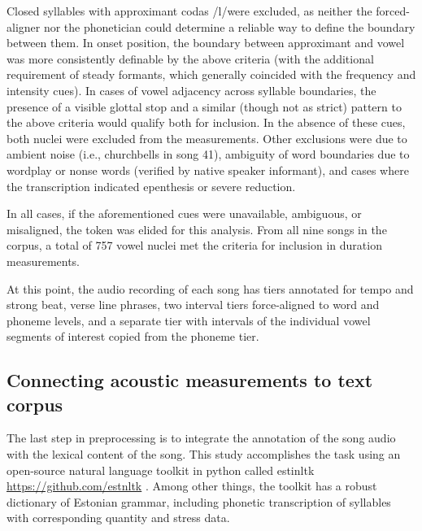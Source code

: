Closed syllables with approximant codas /l/were excluded, as neither the forced-aligner nor the phonetician could determine a reliable way to define the boundary between them. In onset position, the boundary between approximant and vowel was more consistently definable by the above criteria (with the additional requirement of steady formants, which generally coincided with the frequency and intensity cues). In cases of vowel adjacency across syllable boundaries, the presence of a visible glottal stop and a similar (though not as strict) pattern to the above criteria would qualify both for inclusion. In the absence of these cues, both nuclei were excluded from the measurements. Other exclusions were due to ambient noise (i.e., churchbells in song 41), ambiguity of word boundaries due to wordplay or nonse words (verified by native speaker informant), and cases where the transcription indicated epenthesis or severe reduction. 


In all cases, if the aforementioned cues were unavailable, ambiguous, or misaligned, the token was elided for this analysis. From all nine songs in the corpus, a total of 757 vowel nuclei met the criteria for inclusion in duration measurements. 


At this point, the audio recording of each song has tiers annotated for tempo and strong beat, verse line phrases, two interval tiers force-aligned to word and phoneme levels, and a separate tier with intervals of the individual vowel segments of interest copied from the phoneme tier.
\subsection{Connecting acoustic measurements to text corpus}

The last step in preprocessing is to integrate the annotation of the song audio with the lexical content of the song. This study accomplishes the task using an open-source natural language toolkit in python called estinltk \url{https://github.com/estnltk} \citep{estnltk2020}. Among other things, the toolkit has a robust dictionary of Estonian grammar, including phonetic transcription of syllables with corresponding quantity and stress data. 


